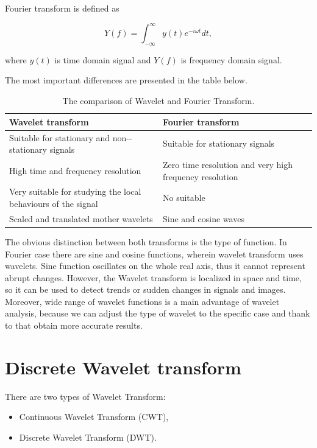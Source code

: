 \begin{defn}
Fourier transform is defined as

\begin{equation}
Y(f)=\int_{-\infty}^{\infty} y(t) e^{-i\omega t} dt,
\end{equation}

where $y(t)$ is time domain signal and $Y(f)$ is frequency domain signal.
\end{defn}

The most important differences are presented in the table below.

\begin{table}[h]
\centering
\begin{tabular}{|p{0.5\linewidth}|p{0.5\linewidth}|}
\toprule
\textbf{ Wavelet transform} & \textbf{Fourier transform}
\\ \midrule
Suitable for stationary and non-\allowbreak -stationary signals 
& Suitable for stationary signals 
\\ \midrule
High time and frequency resolution
& Zero time resolution and very high frequency resolution     
\\ \midrule
Very suitable for studying the local behaviours of the signal
& No suitable  
\\ \midrule
Scaled and translated mother wavelets
& Sine and cosine waves
\\ \bottomrule
\end{tabular}
\caption{The comparison of Wavelet and Fourier Transform.}
\end{table}

The obvious distinction between both transforms is the type of function. In Fourier case there are sine and cosine functions, wherein wavelet transform uses wavelets. Sine function oscillates on the whole real axis, thus it cannot represent abrupt changes. However, the Wavelet transform is localized in space and time, so it can be used to detect trends or sudden changes in signals and images. Moreover, wide range of wavelet functions is a main advantage of wavelet analysis, because we can adjust the type of wavelet to the specific case and thank to that obtain more accurate results.

\section{Discrete Wavelet transform}

There are two types of Wavelet Transform:
\begin{itemize}
	\item Continuous Wavelet Transform (CWT),
	\item Discrete Wavelet Transform (DWT).
\end{itemize}

